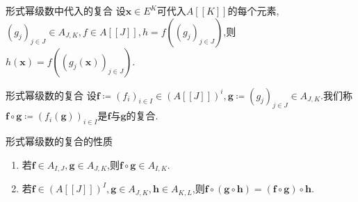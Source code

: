 \begin{proposition}{形式幂级数中代入的复合}{}
	设$\mathbf{x}\in E^{K}$可代入$A[[K]]$的每个元素,$\left(g_{j}\right)_{j\in J}\in A_{J,K},f\in A[[J]],h=f\left(\left(g_{j}\right)_{j\in J}\right)$,则$h\left(\mathbf{x}\right)=f\left(\left(g_{j}\left(\mathbf{x}\right)\right)_{j\in J}\right)$.
\end{proposition}

\begin{definition}{形式幂级数的复合}{}
	设$\mathbf{f}\coloneq\left(f_{i}\right)_{i\in I}\in\left(A[[J]]\right)^{i},\mathbf{g}\coloneq\left(g_{j}\right)_{j\in J}\in A_{J,K}$.我们称$\mathbf{f}\circ\mathbf{g}\coloneq\left(f_{i}\left(\mathbf{g}\right)\right)_{i\in I}$是$\mathbf{f}$与$\mathbf{g}$的复合.
\end{definition}

\begin{proposition}{形式幂级数的复合的性质}{}
	\begin{enumerate}
		\item 若$\mathbf{f}\in A_{I,J},\mathbf{g}\in A_{J,K}$,则$\mathbf{f}\circ\mathbf{g}\in A_{I,K}$.
		\item 若$\mathbf{f}\in\left(A[[J]]\right)^{I},\mathbf{g}\in A_{J,K},\mathbf{h}\in A_{K,L}$,则$\mathbf{f}\circ\left(\mathbf{g}\circ\mathbf{h}\right)=\left(\mathbf{f}\circ\mathbf{g}\right)\circ\mathbf{h}$.
	\end{enumerate}
\end{proposition}
